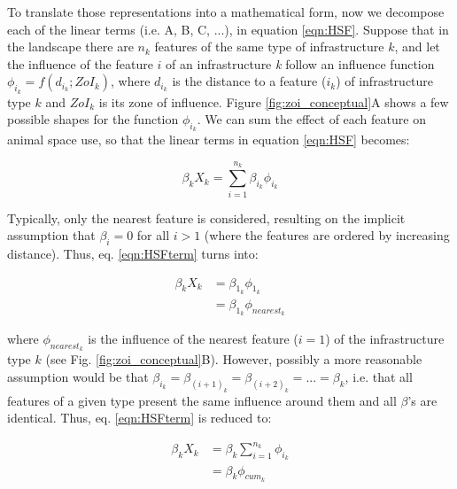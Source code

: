 \documentclass[titlepage]{article}
\begin{document}
To translate those representations into a mathematical form, now we decompose each of the linear terms (i.e. A, B, C, ...), in equation \ref{eqn:HSF}. Suppose that in the landscape there are $n_k$ features of the same type of infrastructure $k$, and let the influence of the feature $i$ of an infrastructure \textit{k} follow an influence function \citep[or ``weighting function", ][]{miguet_how_2017} $\phi_{i_k} = f(d_{i_k}; ZoI_k)$, where $d_{i_k}$ is the distance to a feature ($i_k$) of infrastructure type $k$ and $ZoI_k$ is its zone of influence. Figure \ref{fig:zoi_conceptual}A shows a few possible shapes for the function $\phi_{i_k}$. We can sum the effect of each feature on animal space use, so that the linear terms in equation \ref{eqn:HSF} becomes:

\begin{equation}
\label{eqn:HSFterm}
    \beta_k X_k = \sum_{i=1}^{n_k} \beta_{i_k} \phi_{i_k}
\end{equation}

Typically, only the nearest feature is considered, resulting on the implicit assumption that $\beta_i = 0$ for all $i > 1$ (where the features are ordered by increasing distance). Thus, eq. \ref{eqn:HSFterm} turns into:

\begin{equation}
\label{eqn:HSFnearest}
\begin{split}
    \beta_k X_k & = \beta_{1_k} \phi_{1_k} \\
                & = \beta_{1_k} \phi_{nearest_k}
\end{split}                
\end{equation}

where $\phi_{nearest_k}$ is the influence of the nearest feature ($i = 1$) of the infrastructure type $k$ (see Fig. \ref{fig:zoi_conceptual}B). However, possibly a more reasonable assumption would be that $\beta_{i_k} = \beta_{{(i+1)}_k} = \beta_{{(i+2)}_k} = ... = \beta_k$, i.e. that all features of a given type present the same influence around them and all $\beta$'s are identical. Thus, eq. \ref{eqn:HSFterm} is reduced to:

\begin{equation}
\label{eqn:HSFcuminf}
\begin{split}
    \beta_k X_k & = \beta_k \sum_{i=1}^{n_k} \phi_{i_k} \\
                & = \beta_k \phi_{cum_k}
\end{split}
\end{equation}
\end{document}
